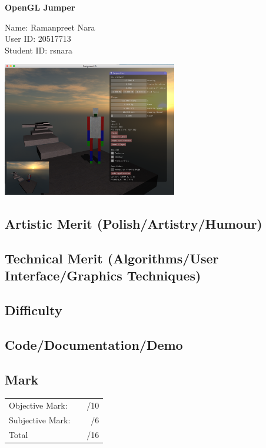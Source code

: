 \documentclass{article}
\newcommand\projecttitle{OpenGL Jumper}
\newcommand\myname{Ramanpreet Nara}
\newcommand\myuserid{20517713}
\newcommand\mystudentid{rsnara}
\begin{document}
\begin{minipage}[t]{3in}
{\huge \bf
	\projecttitle
}

\medskip
Name: \myname \\
User ID: \myuserid \\
Student ID: \mystudentid
\end{minipage}
\hfill
\begin{minipage}[t]{3in}
\vspace{0pt}
\includegraphics[width=3in]{screenshot.png}   %
\end{minipage}


\subsection*{Artistic Merit (Polish/Artistry/Humour)}
\vfill
\subsection*{Technical Merit (Algorithms/User Interface/Graphics Techniques)}
\vfill
\subsection*{Difficulty}
\vfill
\subsection*{Code/Documentation/Demo}
\vfill
\subsection*{Mark}
\begin{center}
\begin{tabular}{lr}
Objective Mark: &~~/10\\
Subjective Mark: &~~/6\\
\hline
Total &~~/16
\end{tabular}
\end{center}
\end{document}
